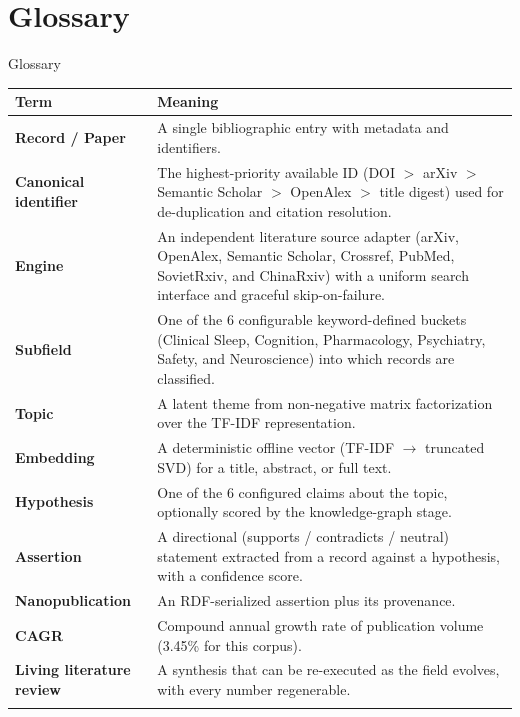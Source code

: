 \documentclass[
  ignorenonframetext,
]{beamer}
\author{\texorpdfstring{}{}}
\date{}
\newcounter{none} %
\begin{document}
\section{Glossary}\label{glossary}

\begin{frame}[allowframebreaks]{Glossary}
{\def\LTcaptype{none} %
\begin{longtable}[]{@{}
  >{\raggedright\arraybackslash}p{}
  >{\raggedright\arraybackslash}p{}@{}}
\toprule\noalign{}
\begin{minipage}[b]{\linewidth}\raggedright
Term
\end{minipage} & \begin{minipage}[b]{\linewidth}\raggedright
Meaning
\end{minipage} \\
\midrule\noalign{}
\endhead
\textbf{Record / Paper} & A single bibliographic entry with metadata and
identifiers. \\
\textbf{Canonical identifier} & The highest-priority available ID (DOI
\(>\) arXiv \(>\) Semantic Scholar \(>\) OpenAlex \(>\) title digest)
used for de-duplication and citation resolution. \\
\textbf{Engine} & An independent literature source adapter (arXiv,
OpenAlex, Semantic Scholar, Crossref, PubMed, SovietRxiv, and ChinaRxiv)
with a uniform search interface and graceful skip-on-failure. \\
\textbf{Subfield} & One of the 6 configurable keyword-defined buckets
(Clinical Sleep, Cognition, Pharmacology, Psychiatry, Safety, and
Neuroscience) into which records are classified. \\
\textbf{Topic} & A latent theme from non-negative matrix factorization
over the TF-IDF representation. \\
\textbf{Embedding} & A deterministic offline vector (TF-IDF
\(\rightarrow\) truncated SVD) for a title, abstract, or full text. \\
\textbf{Hypothesis} & One of the 6 configured claims about the topic,
optionally scored by the knowledge-graph stage. \\
\textbf{Assertion} & A directional (supports / contradicts / neutral)
statement extracted from a record against a hypothesis, with a
confidence score. \\
\textbf{Nanopublication} & An RDF-serialized assertion plus its
provenance. \\
\textbf{CAGR} & Compound annual growth rate of publication volume
(3.45\% for this corpus). \\
\textbf{Living literature review} & A synthesis that can be re-executed
as the field evolves, with every number regenerable. \\
\bottomrule\noalign{}
\end{longtable}
}
\end{frame}
\end{document}
